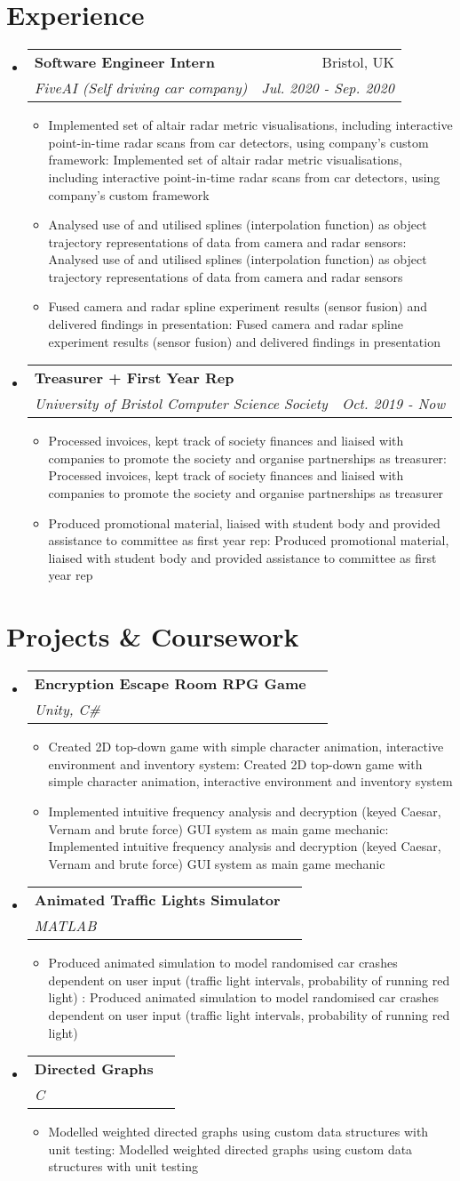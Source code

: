 \documentclass[a4paper,11pt]{article}
\makeatletter
\def \ifempty#1{\def\temp{#1} \ifx\temp\empty }
\newcommand{\resumeItem}[2]{
  \item\small{
  	\ifempty{#1}#2\else\textbf{#1}{: #2 \vspace{-2pt}}\fi
  }
}
\newcommand{\resumeSubheading}[4]{
  \vspace{-1pt}\item
    \begin{tabular*}{0.97\textwidth}{l@{\extracolsep{\fill}}r}
      \textbf{#1} & #2 \\
      \textit{\small#3} & \textit{\small #4} \\
    \end{tabular*}\vspace{-5pt}
}
\newcommand{\resumeSubHeadingListStart}{\begin{itemize}[leftmargin=*]}
\newcommand{\resumeSubHeadingListEnd}{\end{itemize}}
\newcommand{\resumeItemListStart}{\begin{itemize}}
\newcommand{\resumeItemListEnd}{\end{itemize}\vspace{-5pt}}
\makeatother
\begin{document}
\section{Experience}
  \resumeSubHeadingListStart
    \resumeSubheading
      {Software Engineer Intern}{Bristol, UK}
      {FiveAI (Self driving car company)}{Jul. 2020 - Sep. 2020}
      \resumeItemListStart
      	\resumeItem{}
          {Implemented set of altair radar metric visualisations, including interactive point-in-time radar scans from car detectors, using company's custom framework}
      	\resumeItem{}
          {Analysed use of and utilised splines (interpolation function) as object trajectory representations of data from camera and radar sensors}
        \resumeItem{}
          {Fused camera and radar spline experiment results (sensor fusion) and delivered findings in presentation}
        \resumeItemListEnd

    \resumeSubheading
      {Treasurer + First Year Rep}{}
      {University of Bristol Computer Science Society}{Oct. 2019 - Now}
      \resumeItemListStart
      	\resumeItem{}
          {Processed invoices, kept track of society finances and liaised with companies to promote the society and organise partnerships as treasurer}
        \resumeItem{}
          {Produced promotional material, liaised with student body and provided assistance to committee as first year rep}
      \resumeItemListEnd

  \resumeSubHeadingListEnd


\section{Projects \& Coursework}
  \resumeSubHeadingListStart
    \resumeSubheading
      {Encryption Escape Room RPG Game}{}
      {Unity, C\#}{}
      \resumeItemListStart
        \resumeItem{}
          {Created 2D top-down game with simple character animation, interactive environment and inventory system}
        \resumeItem{}
          {Implemented intuitive frequency analysis and decryption (keyed Caesar, Vernam and brute force) GUI system as main game mechanic}
      \resumeItemListEnd
    \resumeSubheading
      {Animated Traffic Lights Simulator}{}
      {MATLAB}{}
      \resumeItemListStart
        \resumeItem{}
          {Produced animated simulation to model randomised car crashes dependent on user input (traffic light intervals, probability of running red light) }
      \resumeItemListEnd
    \resumeSubheading
      {Directed Graphs}{}
      {C}{}
      \resumeItemListStart
        \resumeItem{}
          {Modelled weighted directed graphs using custom data structures with unit testing}
      \resumeItemListEnd
  \resumeSubHeadingListEnd
\end{document}
